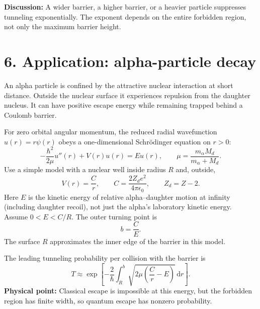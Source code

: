 \documentclass[11pt]{article}
\newcommand{\dd}{\,\mathrm{d}}
\begin{document}
\textbf{Discussion:} A wider barrier, a higher barrier, or a heavier particle suppresses tunneling exponentially. The exponent depends on the entire forbidden region, not only the maximum barrier height.

\newpage
\section*{6. Application: alpha-particle decay}
An alpha particle is confined by the attractive nuclear interaction at short distance. Outside the nuclear surface it experiences repulsion from the daughter nucleus. It can have positive escape energy while remaining trapped behind a Coulomb barrier.

For zero orbital angular momentum, the reduced radial wavefunction $u(r)=r\psi(r)$ obeys a one-dimensional Schr\"odinger equation on $r>0$:
\begin{equation}
-\frac{\hbar^2}{2\mu}u''(r)+V(r)u(r)=Eu(r),\qquad
\mu=\frac{m_\alpha M_d}{m_\alpha+M_d}.
\end{equation}
Use a simple model with a nuclear well inside radius $R$ and, outside,
\begin{equation}
V(r)=\frac{C}{r},\qquad
C=\frac{2Z_de^2}{4\pi\epsilon_0},\qquad Z_d=Z-2.
\end{equation}
Here $E$ is the kinetic energy of relative alpha--daughter motion at infinity (including daughter recoil), not just the alpha's laboratory kinetic energy. Assume $0<E<C/R$. The outer turning point is
\begin{equation}
\boxed{b=\frac{C}{E}.}
\end{equation}
The surface $R$ approximates the inner edge of the barrier in this model.

\begin{center}
\end{center}
The leading tunneling probability per collision with the barrier is
\begin{equation}
\boxed{T\approx\exp\left[-\frac{2}{\hbar}
\int_R^b\sqrt{2\mu\left(\frac{C}{r}-E\right)}\dd r\right].}
\end{equation}
\textbf{Physical point:} Classical escape is impossible at this energy, but the forbidden region has finite width, so quantum escape has nonzero probability.
\end{document}
